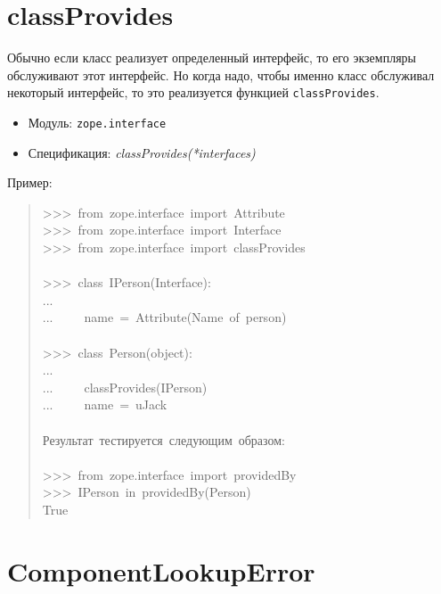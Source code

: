 \documentclass[a4paper,openany,twoside,final]{book}
\providecommand*{\DUroletitlereference}[1]{\textsl{#1}}
\begin{document}
\section*{classProvides%
  \label{classprovides}%
}

Обычно если класс реализует определенный интерфейс, то его экземпляры
обслуживают этот интерфейс.  Но когда надо, чтобы именно класс
обслуживал некоторый интерфейс, то это реализуется функцией
\texttt{classProvides}.

\begin{itemize}

\item Модуль: \texttt{zope.interface}

\item Спецификация: \DUroletitlereference{classProvides(*interfaces)}

\end{itemize}

Пример:

\begin{quote}{\ttfamily \raggedright \noindent
>{}>{}>~from~zope.interface~import~Attribute\\
>{}>{}>~from~zope.interface~import~Interface\\
>{}>{}>~from~zope.interface~import~classProvides\\
~\\
>{}>{}>~class~IPerson(Interface):\\
...\\
...~~~~~name~=~Attribute(\textquotedbl{}Name~of~person\textquotedbl{})\\
~\\
>{}>{}>~class~Person(object):\\
...\\
...~~~~~classProvides(IPerson)\\
...~~~~~name~=~u\textquotedbl{}Jack\textquotedbl{}\\
~\\
Результат~тестируется~следующим~образом:\\
~\\
>{}>{}>~from~zope.interface~import~providedBy\\
>{}>{}>~IPerson~in~providedBy(Person)\\
True
}
\end{quote}


\section*{ComponentLookupError%
  \label{componentlookuperror}%
}
\end{document}
